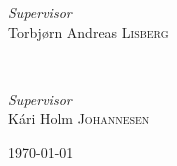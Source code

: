 \begin{titlepage}
	\begin{minipage}{0.35\textwidth}
		\begin{flushleft}
			\large
			\textit{Supervisor}\\
			Torbjørn Andreas \textsc{Lisberg} %
		\end{flushleft}
	\end{minipage}
	~
	\begin{minipage}{0.35\textwidth}
		\begin{flushright}
			\large
			\textit{Supervisor}\\
			Kári Holm \textsc{Johannesen} %
		\end{flushright}
	\end{minipage}
	
	
	
	
	
	
	\vfill\vfill\vfill %
	
	{\large\today} %
	
	
	 
	
	\vfill %
	
\end{titlepage}